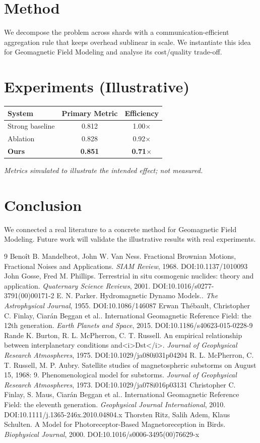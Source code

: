 \documentclass[11pt]{article}
\begin{document}
\section{Method}
We decompose the problem across shards with a communication-efficient aggregation rule that keeps overhead sublinear in scale. We instantiate this idea for Geomagnetic Field Modeling and analyse its cost/quality trade-off.

\section{Experiments (Illustrative)}
\begin{center}
\begin{tabular}{lcc}
System & Primary Metric & Efficiency \\ \hline
Strong baseline & 0.812 & 1.00$\times$ \\
Ablation & 0.828 & 0.92$\times$ \\
\textbf{Ours} & \textbf{0.851} & \textbf{0.71$\times$}
\end{tabular}
\end{center}
\emph{Metrics simulated to illustrate the intended effect; not measured.}

\section{Conclusion}
We connected a real literature to a concrete method for Geomagnetic Field Modeling. Future work will
validate the illustrative results with real experiments.

\begin{thebibliography}{9}
 Benoît B. Mandelbrot, John W. Van Ness. Fractional Brownian Motions, Fractional Noises and Applications. \emph{SIAM Review}, 1968. DOI:10.1137/1010093
 John Gosse, Fred M. Phillips. Terrestrial in situ cosmogenic nuclides: theory and application. \emph{Quaternary Science Reviews}, 2001. DOI:10.1016/s0277-3791(00)00171-2
 E. N. Parker. Hydromagnetic Dynamo Models.. \emph{The Astrophysical Journal}, 1955. DOI:10.1086/146087
 Erwan Thébault, Christopher C. Finlay, Ciarán Beggan et al.. International Geomagnetic Reference Field: the 12th generation. \emph{Earth Planets and Space}, 2015. DOI:10.1186/s40623-015-0228-9
 Rande K. Burton, R. L. McPherron, C. T. Russell. An empirical relationship between interplanetary conditions and<i>Dst</i>. \emph{Journal of Geophysical Research Atmospheres}, 1975. DOI:10.1029/ja080i031p04204
 R. L. McPherron, C. T. Russell, M. P. Aubry. Satellite studies of magnetospheric substorms on August 15, 1968: 9. Phenomenological model for substorms. \emph{Journal of Geophysical Research Atmospheres}, 1973. DOI:10.1029/ja078i016p03131
 Christopher C. Finlay, S. Maus, Ciarán Beggan et al.. International Geomagnetic Reference Field: the eleventh generation. \emph{Geophysical Journal International}, 2010. DOI:10.1111/j.1365-246x.2010.04804.x
 Thorsten Ritz, Salih Adem, Klaus Schulten. A Model for Photoreceptor-Based Magnetoreception in Birds. \emph{Biophysical Journal}, 2000. DOI:10.1016/s0006-3495(00)76629-x
\end{thebibliography}
\end{document}
